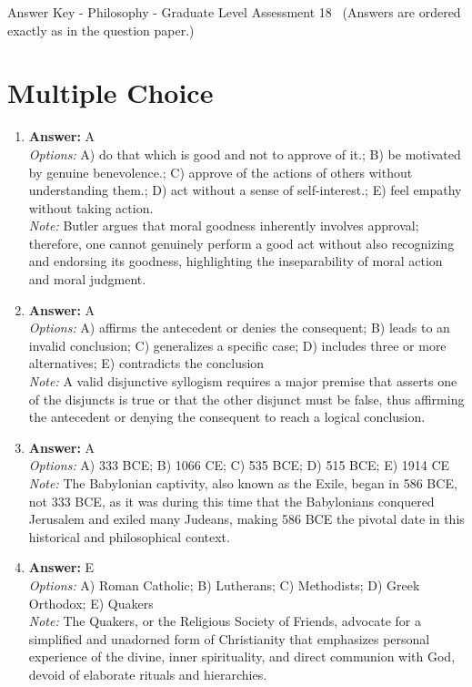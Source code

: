 \documentclass[12pt]{article}
\begin{document}
\begin{center}
Answer Key - Philosophy - Graduate Level Assessment 18 \
\small (Answers are ordered exactly as in the question paper.)
\end{center}

\section*{Multiple Choice}
\begin{enumerate}[label=\arabic*.]
\item \textbf{Answer:} A
\\ \textit{Options:} A) do that which is good and not to approve of it.; B) be motivated by genuine benevolence.; C) approve of the actions of others without understanding them.; D) act without a sense of self-interest.; E) feel empathy without taking action.
\\ \textit{Note:} Butler argues that moral goodness inherently involves approval; therefore, one cannot genuinely perform a good act without also recognizing and endorsing its goodness, highlighting the inseparability of moral action and moral judgment.
\item \textbf{Answer:} A
\\ \textit{Options:} A) affirms the antecedent or denies the consequent; B) leads to an invalid conclusion; C) generalizes a specific case; D) includes three or more alternatives; E) contradicts the conclusion
\\ \textit{Note:} A valid disjunctive syllogism requires a major premise that asserts one of the disjuncts is true or that the other disjunct must be false, thus affirming the antecedent or denying the consequent to reach a logical conclusion.
\item \textbf{Answer:} A
\\ \textit{Options:} A) 333 BCE; B) 1066 CE; C) 535 BCE; D) 515 BCE; E) 1914 CE
\\ \textit{Note:} The Babylonian captivity, also known as the Exile, began in 586 BCE, not 333 BCE, as it was during this time that the Babylonians conquered Jerusalem and exiled many Judeans, making 586 BCE the pivotal date in this historical and philosophical context.
\item \textbf{Answer:} E
\\ \textit{Options:} A) Roman Catholic; B) Lutherans; C) Methodists; D) Greek Orthodox; E) Quakers
\\ \textit{Note:} The Quakers, or the Religious Society of Friends, advocate for a simplified and unadorned form of Christianity that emphasizes personal experience of the divine, inner spirituality, and direct communion with God, devoid of elaborate rituals and hierarchies.

\end{enumerate}
\end{document}
